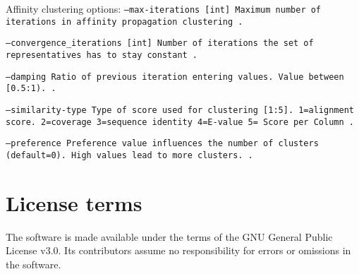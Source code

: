 \documentclass[11pt,a4paper]{report}
\begin{document}
Affinity clustering options:
\texttt{\small --max-iterations         [int]  Maximum number of iterations in affinity propagation clustering .}{\small \par}
\texttt{\small --convergence\_iterations [int]   Number of iterations the set of representatives has to stay constant .}{\small \par}
\texttt{\small --damping Ratio of previous iteration entering values. Value between [0.5:1). .}{\small \par}
\texttt{\small --similarity-type Type of score used for clustering [1:5]. 1=alignment score. 2=coverage 3=sequence identity 4=E-value 5= Score per Column .}{\small \par}
\texttt{\small --preference Preference value influences the number of clusters (default=0). High values lead to more clusters. .}{\small \par}







\section{License terms}

The software is made available under the terms of the GNU General
Public License v3.0. Its contributors assume no responsibility for
errors or omissions in the software.
\end{document}

